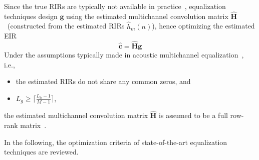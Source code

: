 \documentclass[10pt]{IEEEtran}
\begin{document}
Since the true RIRs are typically not available in practice~\cite{Radlovic_ITSA_2000,Hasan_EUSIPCO_2006,Lin_ITASLP_2012}, equalization techniques design $\mathbf{g}$ using the estimated multichannel convolution matrix $\hat{\mathbf{H}}$~(constructed from the estimated RIRs $\hat{h}_m(n)$), hence optimizing the estimated EIR
\begin{equation}
\boxed{\hat{\mathbf{c}} = \hat{\mathbf{H}}\mathbf{g}}
\end{equation}
Under the assumptions typically made in acoustic multichannel equalization~\cite{Miyoshi_ITASS_1988}, i.e., 
\begin{itemize}
  \item the estimated RIRs do not share any common zeros, and
  \item $L_g \geq \lceil{\frac{L_h-1}{M-1}\rceil}$,
\end{itemize}
the estimated multichannel convolution matrix $\hat{\mathbf{H}}$ is assumed to be a full row-rank matrix~\cite{Harikumar_ITSP_1998}.

In the following, the optimization criteria of state-of-the-art equalization techniques are reviewed.
\end{document}
